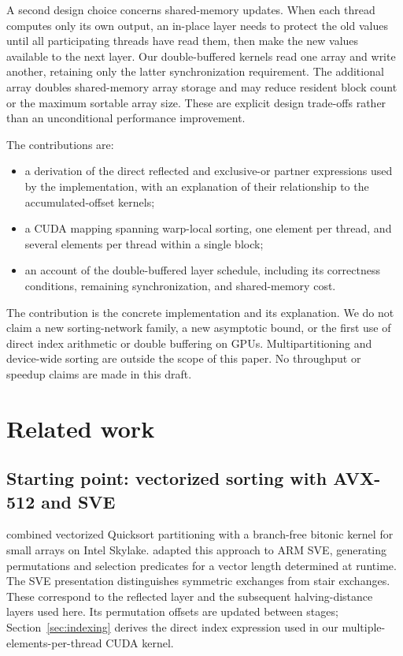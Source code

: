 \documentclass[fleqn,10pt,lineno]{wlpeerj}
\begin{document}
A second design choice concerns shared-memory updates. When each thread computes only its own output, an in-place layer needs to protect the old values until all participating threads have read them, then make the new values available to the next layer. Our double-buffered kernels read one array and write another, retaining only the latter synchronization requirement. The additional array doubles shared-memory array storage and may reduce resident block count or the maximum sortable array size. These are explicit design trade-offs rather than an unconditional performance improvement.

The contributions are:
\begin{itemize}[noitemsep]
\item a derivation of the direct reflected and exclusive-or partner expressions used by the implementation, with an explanation of their relationship to the accumulated-offset kernels;
\item a CUDA mapping spanning warp-local sorting, one element per thread, and several elements per thread within a single block;
\item an account of the double-buffered layer schedule, including its correctness conditions, remaining synchronization, and shared-memory cost.
\end{itemize}
The contribution is the concrete implementation and its explanation. We do not claim a new sorting-network family, a new asymptotic bound, or the first use of direct index arithmetic or double buffering on GPUs. Multipartitioning and device-wide sorting are outside the scope of this paper. No throughput or speedup claims are made in this draft.

\section*{Related work}
\label{sec:related_work}
\subsection*{Starting point: vectorized sorting with AVX-512 and SVE}
\citet{bramas2017avx512} combined vectorized Quicksort partitioning with a branch-free bitonic kernel for small arrays on Intel Skylake. \citet{bramas2021sve} adapted this approach to ARM SVE, generating permutations and selection predicates for a vector length determined at runtime. The SVE presentation distinguishes symmetric exchanges from stair exchanges. These correspond to the reflected layer and the subsequent halving-distance layers used here. Its permutation offsets are updated between stages; Section~\ref{sec:indexing} derives the direct index expression used in our multiple-elements-per-thread CUDA kernel.
\end{document}
